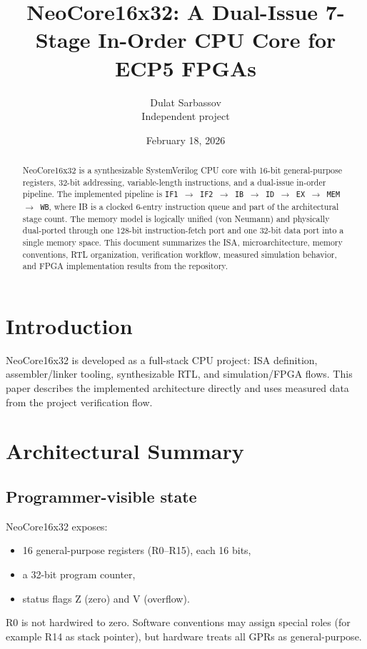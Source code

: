 \documentclass[11pt]{article}
\begin{document}
\title{NeoCore16x32: A Dual-Issue 7-Stage In-Order CPU Core for ECP5 FPGAs}
\author{Dulat Sarbassov\\Independent project}
\date{February 18, 2026}
\maketitle

\begin{abstract}
NeoCore16x32 is a synthesizable SystemVerilog CPU core with 16-bit general-purpose registers, 32-bit addressing, variable-length instructions, and a dual-issue in-order pipeline. The implemented pipeline is \texttt{IF1\,$\rightarrow$\,IF2\,$\rightarrow$\,IB\,$\rightarrow$\,ID\,$\rightarrow$\,EX\,$\rightarrow$\,MEM\,$\rightarrow$\,WB}, where IB is a clocked 6-entry instruction queue and part of the architectural stage count. The memory model is logically unified (von Neumann) and physically dual-ported through one 128-bit instruction-fetch port and one 32-bit data port into a single memory space. This document summarizes the ISA, microarchitecture, memory conventions, RTL organization, verification workflow, measured simulation behavior, and FPGA implementation results from the repository.
\end{abstract}

\section{Introduction}
NeoCore16x32 is developed as a full-stack CPU project: ISA definition, assembler/linker tooling, synthesizable RTL, and simulation/FPGA flows. This paper describes the implemented architecture directly and uses measured data from the project verification flow.

\section{Architectural Summary}
\subsection{Programmer-visible state}
NeoCore16x32 exposes:
\begin{itemize}[leftmargin=*]
  \item 16 general-purpose registers (R0--R15), each 16 bits,
  \item a 32-bit program counter,
  \item status flags Z (zero) and V (overflow).
\end{itemize}
R0 is not hardwired to zero. Software conventions may assign special roles (for example R14 as stack pointer), but hardware treats all GPRs as general-purpose.
\end{document}

